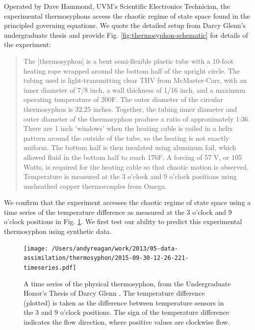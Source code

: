 Operated by Dave Hammond, UVM's Scientific Electronics Technician, the experimental thermosyphons access the chaotic regime of state space found in the principled governing equations.
We quote the detailed setup from Darcy Glenn's undergraduate thesis \cite{glenn2013} and provide Fig. \ref{fig:thermosyphon-schematic} for details of the experiment:
\begin{quote}
The [thermosyphon] is a bent semi-flexible plastic tube with a 10-foot heating rope wrapped around the bottom half of the upright circle.
The tubing used is light-transmitting clear THV from McMaster-Carr, with an inner diameter of 7/8 inch, a wall thickness of 1/16 inch, and a maximum operating temperature of 200F.
The outer diameter of the circular thermosyphon is 32.25 inches.
Together, the tubing inner diameter and outer diameter of the thermosyphon produce a ratio of approximately 1:36.
There are 1 inch 'windows' when the heating cable is coiled in a helix pattern around the outside of the tube, so the heating is not exactly uniform.
The bottom half is then insulated using aluminum foil, which allowed fluid in the bottom half to reach 176F.
A forcing of 57 V, or 105 Watts, is required for the heating cable so that chaotic motion is observed.
Temperature is measured at the 3 o'clock and 9 o'clock positions using unsheathed copper thermocouples from Omega.
\end{quote}
We confirm that the experiment accesses the chaotic regime of state space using a time series of the temperature difference as measured at the 3 o'clock and 9 o'clock positions in Fig. \ref{fig:thermosyphon-physical-timeseries}.
We first test our ability to predict this experimental thermosyphon using synthetic data.

\begin{figure}[h]
  \centering
  \texttt{[image: /Users/andyreagan/work/2013/05-data-assimilation/thermosyphon/2015-09-30-12-26-221-timeseries.pdf]}
  \caption[A time series of the physical thermosyphon, from the Undergraduate Honor's Thesis of Darcy Glenn {\protect \cite{glenn2013}}]{
    A time series of the physical thermosyphon, from the Undergraduate Honor's Thesis of Darcy Glenn {\protect \cite{glenn2013}}.
    The temperature difference (plotted) is taken as the difference between temperature sensors in the 3 and 9 o'clock positions.
    The sign of the temperature difference indicates the flow direction, where positive values are clockwise flow.
  }
  \label{fig:thermosyphon-physical-timeseries}
\end{figure}

